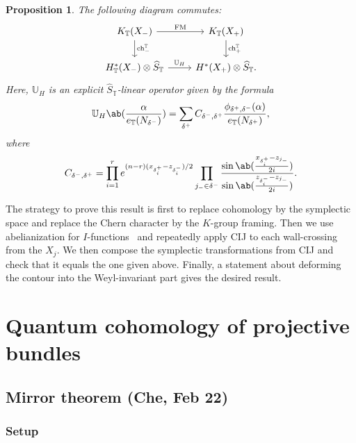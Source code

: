 \documentclass[leqno, openany]{memoir}
\newtheorem{prop}[thm]{Proposition}
\theoremstyle{definition}
\theoremstyle{remark}
\theoremstyle{plain}
\theoremstyle{definition}
\theoremstyle{remark}
\newcommand{\T}{\mathbb{T}}
\newcommand{\on}[1]{\operatorname{#1}}
\newcommand{\wh}[1]{\widehat{#1}}
\begin{document}
\begin{prop}
    The following diagram commutes:
    \begin{equation*}
    \begin{tikzcd}
        K_{\T}(X_-) \ar{r}{\on{FM}} \ar{d}{\on{ch}^{\T}_-} & K_{\T}(X_+) \ar{d}{\on{ch}^{\T}_+} \\
        H_{\T}^*(X_-) \otimes \wh{S}_{\T} \ar{r}{\mathbb{U}_H} & H^*(X_+) \otimes \wh{S}_{\T}.
    \end{tikzcd}
    \end{equation*}
    Here, $\mathbb{U}_H$ is an explicit $\wh{S}_{\T}$-linear operator given by the formula
    \begin{align*}
        \mathbb{U}_H\ab(\frac{\alpha}{e_{\T}(N_{\delta^-})}) = \sum_{\delta^+} C_{\delta^-, \delta^+} \frac{\phi_{\delta^+, \delta^-}(\alpha)}{e_{\T}(N_{\delta^+})},
    \end{align*}
    where
    \[ C_{\delta^-, \delta^+} = \prod_{i=1}^r e^{(n-r)(x_{\delta_i^+} - z_{\delta_i^-})/2} \prod_{j_- \in \delta^-} \frac{\sin \ab(\frac{x_{\delta_i^+} - z_{j_-}}{2i})}{\sin\ab(\frac{z_{\delta_i^-} - z_{j_-}}{2i})}. \]
\end{prop}

The strategy to prove this result is first to replace cohomology by the symplectic space and replace the Chern character by the $K$-group framing. Then we use abelianization for $I$-functions~\cite{abnonabifn} and repeatedly apply CIJ to each wall-crossing from the $X_j$. We then compose the symplectic transformations from CIJ and check that it equals the one given above. Finally, a statement about deforming the contour into the Weyl-invariant part gives the desired result.

\chapter{Quantum cohomology of projective bundles}%
\label{cha:Quantum cohomology of projective bundles}

\section{Mirror theorem (Che, Feb 22)}%
\label{sec:Mirror theorem}

\subsection{Setup}%
\label{sub:Setup}
\end{document}
